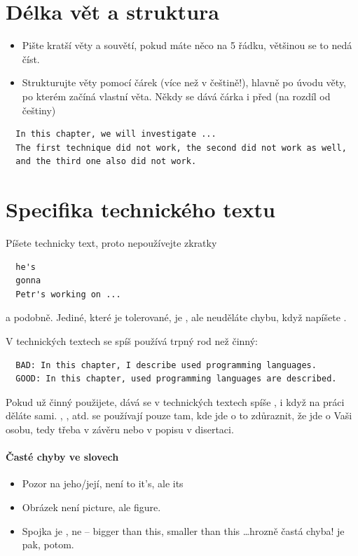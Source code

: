 \section*{Délka vět a struktura}

\begin{itemize}
  \item{Pište kratší věty a souvětí, pokud máte něco na 5 řádku, většinou se to nedá číst.}
  \item{Strukturujte věty pomocí čárek (více než v češtině!), hlavně po úvodu věty, po kterém začíná vlastní věta. Někdy se dává čárka i před  (na rozdíl od češtiny)}
\end{itemize}
\begin{verbatim}
  In this chapter, we will investigate ...
  The first technique did not work, the second did not work as well,
  and the third one also did not work.
\end{verbatim}

\section*{Specifika technického textu}

Píšete technicky text, proto nepoužívejte zkratky
\begin{verbatim}
  he's
  gonna
  Petr's working on ...
\end{verbatim}
\noindent a podobně. Jediné, které je tolerované, je , ale neuděláte chybu, když napíšete .

\begin{samepage}
\noindent V technických textech se spíš používá trpný rod než činný:
\begin{verbatim}
  BAD: In this chapter, I describe used programming languages.
  GOOD: In this chapter, used programming languages are described.
\end{verbatim}
\end{samepage}

Pokud už činný použijete, dává se v technických textech spíše , i když na práci děláte sami. , , atd. se používají pouze tam, kde jde o to zdůraznit, že jde o Vaši osobu, tedy třeba v závěru nebo v popisu  v disertaci.

\paragraph{Časté chyby ve slovech}

\begin{itemize}
  \item{Pozor na jeho/její, není to it's, ale its }
  \item{Obrázek není picture, ale figure. }
  \item{Spojka  je , ne  -- bigger than this, smaller than this \ldots hrozně častá chyba!  je pak, potom.}
\end{itemize}


